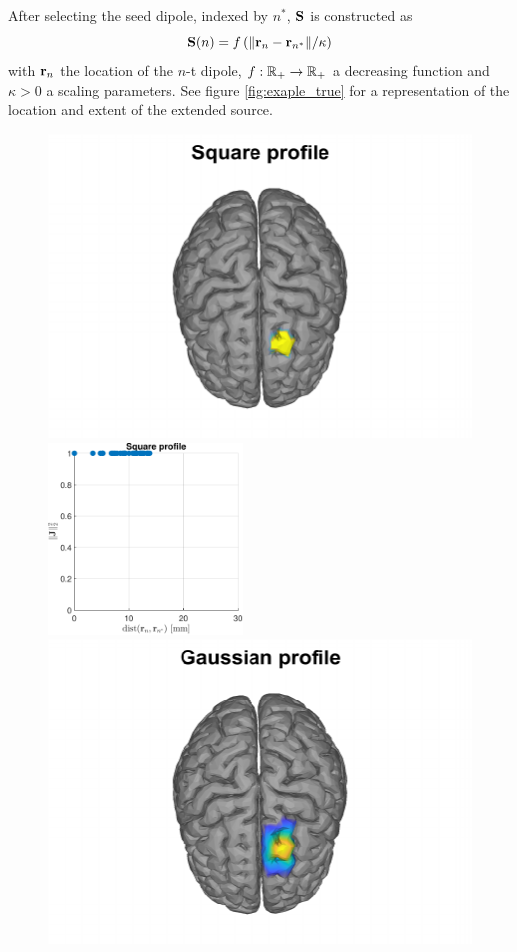 After selecting the seed dipole, indexed by $n^*$, $\mathbf{S}$ is constructed as
\begin{equation}
\mathbf{S}(n) = f\left(  \lVert \mathbf{r}_n-\mathbf{r}_{n^*} \rVert / \kappa  \right)
\end{equation}
with $\mathbf{r}_n$ the location of the $n$-t dipole, $f:\mathbb{R}_+\rightarrow \mathbb{R}_+$ a decreasing function and $\kappa>0$ a scaling parameters.
%
See figure \ref{fig:exaple_true} for a representation of the location and extent of the extended source.

\begin{figure}
\centering
\includegraphics{./img_MATLAB/square_GroundTruth}
\includegraphics[height=2in]{./img_MATLAB/square_Profile}
\includegraphics{./img_MATLAB/gauss_GroundTruth}

\end{figure}
